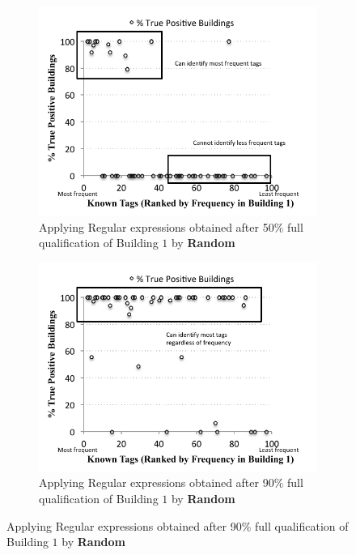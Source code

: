 \begin{figure}[ht!]
\begin{subfigure}{0.4\textwidth}
		\label{fig:point90}
	\end{subfigure}
	\begin{subfigure}{0.4\textwidth}
                \centering
		\includegraphics[width=\textwidth]{./figs/recallCampusWide-build-50.pdf}
                \caption{Applying Regular expressions obtained after 50\% full qualification of Building $1$ by {\bf Random}}
		\label{fig:point50}
	\end{subfigure}
	\begin{subfigure}{0.4\textwidth}
                \centering
		\includegraphics[width=\textwidth]{./figs/recallCampusWide-build-90.pdf}
                \caption{Applying Regular expressions obtained after 90\% full qualification of Building $1$ by {\bf Random}}
		\label{fig:point90}
	\end{subfigure}



\end{figure}
